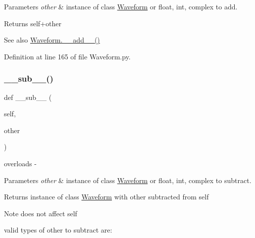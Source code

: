 \begin{DoxyParams}{Parameters}
{\em other} & instance of class \hyperlink{classSignalIntegrity_1_1TimeDomain_1_1Waveform_1_1Waveform_1_1Waveform}{Waveform} or float, int, complex to add. \\
\hline
\end{DoxyParams}
\begin{DoxyReturn}{Returns}
self+other 
\end{DoxyReturn}
\begin{DoxySeeAlso}{See also}
\hyperlink{classSignalIntegrity_1_1TimeDomain_1_1Waveform_1_1Waveform_1_1Waveform_a547cf97e438ebc6734fd6d1ea2b21b6d}{Waveform.\+\_\+\+\_\+add\+\_\+\+\_\+()} 
\end{DoxySeeAlso}


Definition at line 165 of file Waveform.\+py.

\mbox{\label{classSignalIntegrity_1_1TimeDomain_1_1Waveform_1_1Waveform_1_1Waveform_ae03b88268c88fb1edfdb3f5353478d7b}} 
\subsubsection{\texorpdfstring{\+\_\+\+\_\+sub\+\_\+\+\_\+()}{\_\_sub\_\_()}}
{\footnotesize\ttfamily def \+\_\+\+\_\+sub\+\_\+\+\_\+ (\begin{DoxyParamCaption}\item[{}]{self,  }\item[{}]{other }\end{DoxyParamCaption})}



overloads -\/ 


\begin{DoxyParams}{Parameters}
{\em other} & instance of class \hyperlink{classSignalIntegrity_1_1TimeDomain_1_1Waveform_1_1Waveform_1_1Waveform}{Waveform} or float, int, complex to subtract. \\
\hline
\end{DoxyParams}
\begin{DoxyReturn}{Returns}
instance of class \hyperlink{classSignalIntegrity_1_1TimeDomain_1_1Waveform_1_1Waveform_1_1Waveform}{Waveform} with other subtracted from self 
\end{DoxyReturn}
\begin{DoxyNote}{Note}
does not affect self 

valid types of other to subtract are\+:
\end{DoxyNote}

